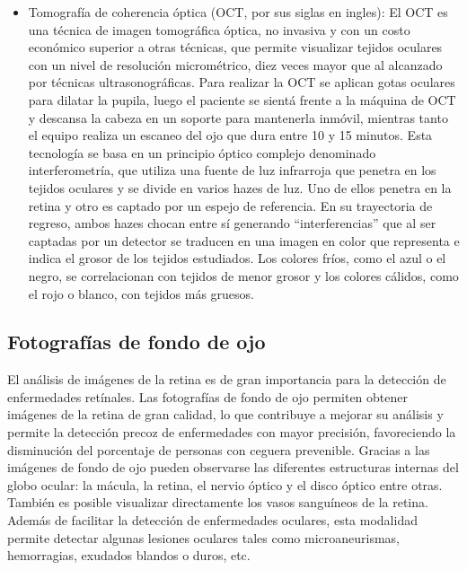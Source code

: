 \begin{itemize}
\item Tomograf\'ia de coherencia \'optica (OCT, por sus siglas en ingles): El OCT es una t\'ecnica de imagen tomogr\'afica \'optica, no invasiva y con un costo econ\'omico superior a otras t\'ecnicas, que permite visualizar tejidos oculares con un nivel de resoluci\'on microm\'etrico, diez veces mayor que al alcanzado por t\'ecnicas ultrasonogr\'aficas. Para realizar la OCT se aplican  gotas oculares para dilatar la pupila, luego el paciente se sient\'a frente a la m\'aquina de OCT y descansa  la cabeza en un soporte para mantenerla inm\'ovil, mientras tanto el equipo realiza un escaneo del ojo que dura entre 10 y 15 minutos. Esta tecnolog\'ia se basa en un principio \'optico complejo denominado interferometr\'ia, que utiliza una fuente de luz infrarroja que penetra en los tejidos oculares y se divide en varios hazes de luz. Uno de ellos penetra en la retina y otro es captado por un espejo de referencia. En su trayectoria de regreso, ambos hazes chocan entre s\'i generando “interferencias” que al ser captadas por un detector se traducen en una imagen en color que representa e indica el grosor de los tejidos estudiados. Los colores fr\'ios, como el azul o el negro, se correlacionan con tejidos de menor grosor y los colores c\'alidos, como el rojo o blanco, con tejidos m\'as gruesos. 

\end{itemize}



\subsection{Fotograf\'ias de fondo de ojo}

El an\'alisis de im\'agenes de la retina es de gran importancia para la detecci\'on de enfermedades ret\'inales. Las fotograf\'ias de fondo de ojo permiten obtener im\'agenes de la retina de gran calidad, lo que contribuye a mejorar su an\'alisis y permite la detecci\'on precoz de enfermedades con mayor precisi\'on, favoreciendo la disminuci\'on del porcentaje de personas con ceguera prevenible. 
Gracias a las im\'agenes de fondo de ojo pueden observarse las diferentes estructuras internas del globo ocular: la m\'acula, la retina, el nervio \'optico y el disco \'optico entre otras. Tambi\'en es posible visualizar directamente los vasos sangu\'ineos de la retina. Adem\'as de facilitar la detecci\'on de enfermedades oculares, esta modalidad permite detectar algunas lesiones oculares tales como microaneurismas, hemorragias, exudados blandos o duros, etc.

